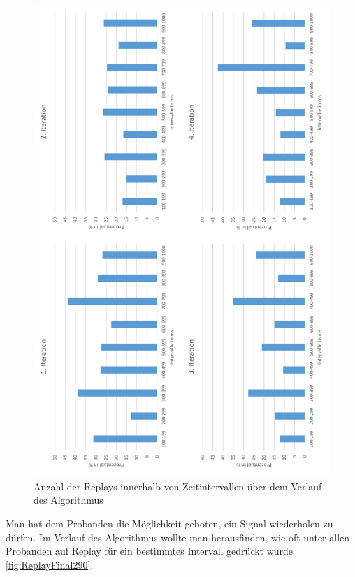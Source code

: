 \begin{figure}[htbp] 
            \centering
   	\includegraphics[width=\textwidth]{pics/analyse/algo/Replay/ReplayFinal290.png}
	\caption{Anzahl der Replays innerhalb von Zeitintervallen {\"u}ber dem Verlauf des Algorithmus}
	\label{fig:ReplayFinal290}
\end{figure}

Man hat dem Probanden die M{\"o}glichkeit geboten, ein Signal wiederholen zu d{\"u}rfen. 
Im Verlauf des Algorithmus wollte man herausfinden, wie oft unter allen Probanden auf Replay f{\"u}r ein bestimmtes Intervall gedr{\"u}ckt wurde \autoref{fig:ReplayFinal290}. 

